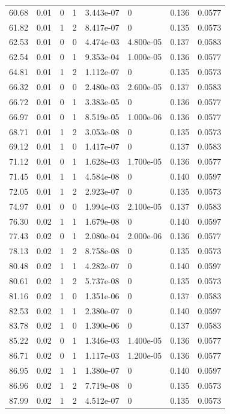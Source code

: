 \documentclass[preview]{standalone}
\begin{document}
{{{\begin{tabular}{L{1.2cm}C{1.2cm} C{0.3cm}C{0.5cm} C{1.4cm}C{1.4cm} C{1.4cm}C{1.4cm}}
  60.68  &  0.01  & 0     &  1 &  3.443e-07  & 0  & 0.136 &  0.0577   \\ 
  61.82  &  0.01  & 1     &  2 &  8.417e-07  & 0  & 0.135 &  0.0573   \\ 
  62.53  &  0.01  & 0     &  0 &  4.474e-03  & 4.800e-05  & 0.137 &  0.0583   \\ 
  62.54  &  0.01  & 0     &  1 &  9.353e-04  & 1.000e-05  & 0.136 &  0.0577   \\ 
  64.81  &  0.01  & 1     &  2 &  1.112e-07  & 0  & 0.135 &  0.0573   \\ 
  66.32  &  0.01  & 0     &  0 &  2.480e-03  & 2.600e-05  & 0.137 &  0.0583   \\ 
  66.72  &  0.01  & 0     &  1 &  3.383e-05  & 0  & 0.136 &  0.0577   \\ 
  66.97  &  0.01  & 0     &  1 &  8.519e-05  & 1.000e-06  & 0.136 &  0.0577   \\ 
  68.71  &  0.01  & 1     &  2 &  3.053e-08  & 0  & 0.135 &  0.0573   \\ 
  69.12  &  0.01  & 1     &  0 &  1.417e-07  & 0  & 0.137 &  0.0583   \\ 
  71.12  &  0.01  & 0     &  1 &  1.628e-03  & 1.700e-05  & 0.136 &  0.0577   \\ 
  71.45  &  0.01  & 1     &  1 &  4.584e-08  & 0  & 0.140 &  0.0597   \\ 
  72.05  &  0.01  & 1     &  2 &  2.923e-07  & 0  & 0.135 &  0.0573   \\ 
  74.97  &  0.01  & 0     &  0 &  1.994e-03  & 2.100e-05  & 0.137 &  0.0583   \\ 
  76.30  &  0.02  & 1     &  1 &  1.679e-08  & 0  & 0.140 &  0.0597   \\ 
  77.43  &  0.02  & 0     &  1 &  2.080e-04  & 2.000e-06  & 0.136 &  0.0577   \\ 
  78.13  &  0.02  & 1     &  2 &  8.758e-08  & 0  & 0.135 &  0.0573   \\ 
  80.48  &  0.02  & 1     &  1 &  4.282e-07  & 0  & 0.140 &  0.0597   \\ 
  80.61  &  0.02  & 1     &  2 &  5.737e-08  & 0  & 0.135 &  0.0573   \\ 
  81.16  &  0.02  & 1     &  0 &  1.351e-06  & 0  & 0.137 &  0.0583   \\ 
  82.53  &  0.02  & 1     &  1 &  2.380e-07  & 0  & 0.140 &  0.0597   \\ 
  83.78  &  0.02  & 1     &  0 &  1.390e-06  & 0  & 0.137 &  0.0583   \\ 
  85.22  &  0.02  & 0     &  1 &  1.346e-03  & 1.400e-05  & 0.136 &  0.0577   \\ 
  86.71  &  0.02  & 0     &  1 &  1.117e-03  & 1.200e-05  & 0.136 &  0.0577   \\ 
  86.95  &  0.02  & 1     &  1 &  1.380e-07  & 0  & 0.140 &  0.0597   \\ 
  86.96  &  0.02  & 1     &  2 &  7.719e-08  & 0  & 0.135 &  0.0573   \\ 
  87.99  &  0.02  & 1     &  2 &  4.512e-07  & 0  & 0.135 &  0.0573   \\ 
\hline 
\end{tabular} 

}}}
\end{document}
